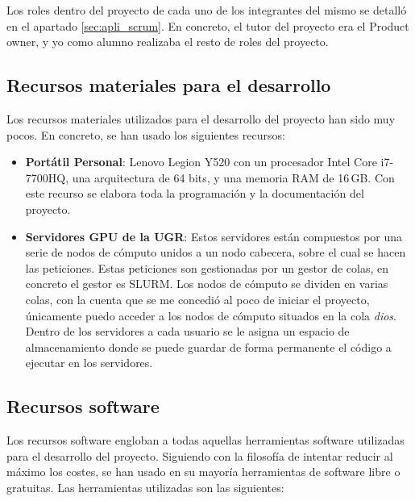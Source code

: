 Los roles dentro del proyecto de cada uno de los integrantes del mismo se detalló en el apartado \ref{sec:apli_scrum}. En concreto, el tutor del proyecto era el Product owner, y yo como alumno realizaba el resto de roles del proyecto.

\subsection{Recursos materiales para el desarrollo}

Los recursos materiales utilizados para el desarrollo del proyecto han sido muy pocos. En concreto, se han usado los siguientes recursos:

\begin{itemize}
\item \textbf{Portátil Personal}: Lenovo Legion Y520 con un procesador Intel Core i7-7700HQ, una arquitectura de 64 bits, y una memoria RAM de 16 GB. Con este recurso se elabora toda la programación y la documentación del proyecto.
\item \textbf{Servidores GPU de la UGR}: Estos servidores están compuestos por una serie de nodos de cómputo unidos a un nodo cabecera, sobre el cual se hacen las peticiones. Estas peticiones son gestionadas por un gestor de colas, en concreto el gestor es SLURM. Los nodos de cómputo se dividen en varias colas, con la cuenta que se me concedió al poco de iniciar el proyecto, únicamente puedo acceder a los nodos de cómputo situados en la cola \textit{dios}. Dentro de los servidores a cada usuario se le asigna un espacio de almacenamiento donde se puede guardar de forma permanente el código a ejecutar en los servidores.
\end{itemize}

\subsection{Recursos software} \label{subsec:recur_software}

Los recursos software engloban a todas aquellas herramientas software utilizadas para el desarrollo del proyecto. Siguiendo con la filosofía de intentar reducir al máximo los costes, se han usado en su mayoría herramientas de software libre o gratuitas. Las herramientas utilizadas son las siguientes:

